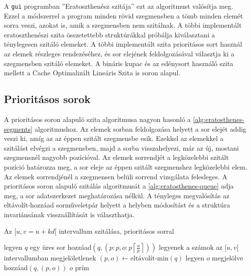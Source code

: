 A \texttt{gui} programban ''Eratoszthenész szitája'' ezt az algoritmust valósítja meg.
Ezzel a módszerrel a program minden rövid szegmensben a tömb minden elemét sorra veszi, azokat is, amik a szegmensben nem szitálnak.
A többi implementált eratoszthenészi szita összetettebb struktúrákkal próbálja kiválasztani a ténylegesen szitáló elemeket.
A többi implementált szita prioritásos sort használ az elemek részleges rendezéséhez, és sor elejének feldolgozásával választja ki a szegmensben szitáló elemeket.
A bináris kupac és az edénysort használó szita mellett a Cache Optimalizált Lineáris Szita is soron alapul.

\subsection{Prioritásos sorok}

A prioritásos soron alapuló szita algoritmusa nagyon hasonló a \ref{alg:eratosthenes-segments} algoritmushoz.
Az elemek sorban feldolgozása helyett a sor elejét addig veszi ki, amíg az az éppen szitált szegmensbe esik.
Ezekkel az elemekkel a szitálást elvégzi a szegmensben, majd a sorba visszahelyezi, már az új, mostani szegmensnél nagyobb pozícióval.
Az elemek sorrendjét a legközelebbi szitált pozíció határozza meg, a sor eleje az éppen szitált szegmenshez legközelebbi elem.
Az elemek sorrendjénél a szegmensen belüli sorrend vizsgálata felesleges.
A prioritásos soron alapuló szitálás algoritmusát a \ref{alg:eratosthenes-queue} adja meg, a sor adatszerkezet meghatározása nélkül.
A tényleges megvalósítás az eltávolít-hozzáad sorműveletpár helyett a helyben módosítást és a struktúra invariánsának visszaállítását is választhatja.

\begin{algorithm}
\caption{Az $[u, v=u+kd[$ intervallum szitálása, prioritásos sorral}
\label{alg:eratosthenes-queue}
\begin{algorithmic}[1]
\State legyen $q$ egy üres sor
	\State hozzáad$(q, (p: p, o: p \left \lceil{\frac{u}{p}}\right \rceil))$
\EndFor
{}
	\State legyenek a számok az $[u, v[$ intervallumban megjelöletlenek
		\State $(p, o) \gets \textrm{eltávolít-min}(q)$
			\State legyen $o$ megjelölve
		\EndFor
		\State hozzáad$(q, (p, o))$
	\EndWhile
	\For{$o \in [u, v[$}
			\State $o$ prím
		\EndIf
	\EndFor
\EndFor
\end{algorithmic}
\end{algorithm}

